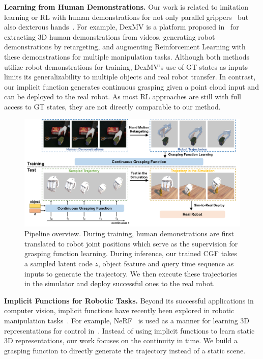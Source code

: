 \documentclass[letterpaper, 10 pt, journal, twoside]{IEEEtran}
\begin{document}
\textbf{Learning from Human Demonstrations.} Our work is related to imitation learning or RL with human demonstrations for not only parallel grippers~\cite{schmeckpeper2020reinforcement,shao2020concept,young2020visual} but also dexterous hands~\cite{gupta2016learning,christen2019guided,qin2021dexmv,sivakumar2022robotic,qin2022one}.
For example, DexMV is a platform proposed in~\cite{qin2021dexmv} for extracting 3D human demonstrations from videos, generating robot demonstrations by retargeting, and augmenting Reinforcement Learning with these demonstrations for multiple manipulation tasks.
Although both methods utilize robot demonstrations for training, DexMV's use of GT states as inputs limits its generalizability to multiple objects and real robot transfer. In contrast, our implicit function generates continuous grasping given a point cloud input and can be deployed to the real robot. As most RL approaches are still with full access to GT states, they are not directly comparable to our method.


\begin{figure}
\centering
  \vspace{-0.1in}
  \includegraphics[width=0.95\linewidth]{figure/pipeline.pdf}
  \vspace{-0.15in}
  \caption{\small
  Pipeline overview. During training, human demonstrations are first translated to robot joint positions which serve as the supervision for grasping function learning. During inference, our trained CGF takes a sampled latent code $z$, object feature and query time sequence as inputs to generate the trajectory. We then execute these trajectories in the simulator and deploy successful ones to the real robot.}
  \vspace{-0.15in}
  \label{fig:overview}
\end{figure}


\textbf{Implicit Functions for Robotic Tasks.} Beyond its successful applications in computer vision, implicit functions have recently been explored in robotic manipulation tasks~\cite{li2021learning,simeonov2021neural,li20223d,jiang2021synergies,adamkiewicz2022vision}. For example, NeRF~\cite{mildenhall2020nerf} is used as a manner for learning 3D representations for control in~\cite{li2021learning}. Instead of using implicit functions to learn static 3D representations, our work focuses on the continuity in time. We build a grasping function to directly generate the trajectory instead of a static scene.
\end{document}
